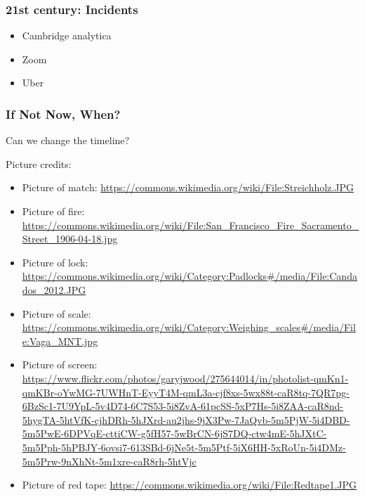 \begin{frame}[fragile]
\frametitle{21st century: Incidents}

\begin{itemize}
\item Cambridge analytica
\item Zoom
\item Uber
\end{itemize}

\end{frame}

\begin{frame}[fragile]
\frametitle{If Not Now, When?}

Can we change the timeline?

\end{frame}


Picture credits:

\begin{itemize}
\item Picture of match: \url{https://commons.wikimedia.org/wiki/File:Streichholz.JPG}
\item Picture of fire: \url{https://commons.wikimedia.org/wiki/File:San_Francisco_Fire_Sacramento_Street_1906-04-18.jpg}
\item Picture of lock: \url{https://commons.wikimedia.org/wiki/Category:Padlocks#/media/File:Candados_2012.JPG}
\item Picture of scale: \url{https://commons.wikimedia.org/wiki/Category:Weighing_scales#/media/File:Vaga_MNT.jpg}
\item Picture of screen: \url{https://www.flickr.com/photos/garyjwood/275644014/in/photolist-qmKn1-qmKBr-oYwMG-7UWHnT-EyyT4M-qmL3a-cjf8xs-5wx88t-caR8tq-7QR7pg-6BzSc1-7U9YpL-5v4D74-6C7S53-5i8ZvA-61pcSS-5xP7Hs-5i8ZAA-caR8nd-5hygTA-5htVfK-cjhDRh-5hJXrd-au2jhs-9jX3Pw-7JaQvb-5m5PjW-5i4DBD-5m5PwE-6DPVqE-cttiCW-g5fH57-5wBrCN-6jS7DQ-ctw4mE-5hJXtC-5m5Pph-5hPBJY-6ovsi7-613SBd-6jNe5t-5m5Ptf-5iX6HH-5xRoUn-5i4DMz-5m5Prw-9nXhNt-5m1xre-caR8rh-5htVjc}
\item Picture of red tape: \url{https://commons.wikimedia.org/wiki/File:Redtape1.JPG}
\end{itemize}


